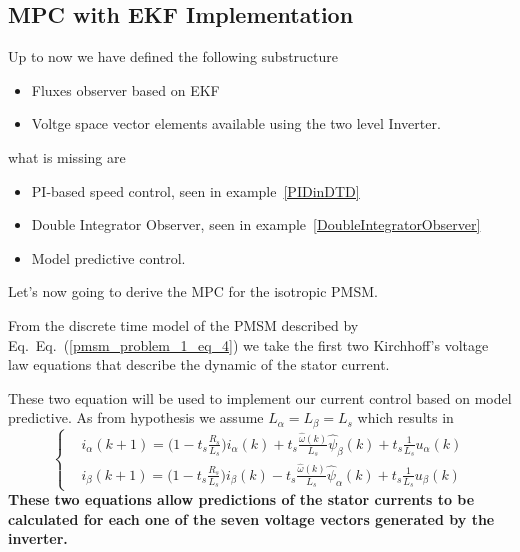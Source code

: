 \documentclass[11pt,a4paper]{scrartcl}
\numberwithin{equation}{section}
\theoremstyle{it}
\theoremstyle{definition}
\renewcommand{\eqref}[1]{Eq.~(\ref{#1})}
\begin{document}
\begin{onehalfspace}
\subsection{MPC with EKF Implementation}
Up to now we have defined the following substructure
\begin{itemize}
	\item[--] Fluxes observer based on EKF 
	\item[--] Voltge space vector elements available using the two level Inverter.
\end{itemize}
what is missing are 
\begin{itemize}
	\item[--] PI-based speed control, seen in example~\ref{PIDinDTD}
	\item[--] Double Integrator Observer, seen in example~\ref{DoubleIntegratorObserver}
	\item[--] Model predictive control.
\end{itemize}
Let's now going to derive the MPC for the isotropic PMSM.

From the discrete time model of the PMSM described by Eq.~\eqref{pmsm_problem_1_eq_4} we take the first two Kirchhoff's voltage law equations that describe the dynamic of the stator current. 

These two equation will be used to implement our current control based on model predictive. As from hypothesis we assume $L_\alpha=L_\beta=L_s$ which results in
\begin{equation}\label{pmsm_problem_1_eq_22}
	\left\lbrace \begin{aligned}
		&i_\alpha(k+1)=\Big(1-t_s\frac{R_s}{L_s}\Big)i_\alpha(k) + 
		t_s\frac{\hat{\omega}(k)}{L_s}\hat{\psi}_\beta(k) + 
		t_s\frac{1}{L_s}u_\alpha(k) \\[6pt] 
		&i_\beta(k+1)=\Big(1-t_s\frac{R_s}{L_s}\Big)i_\beta(k) - 
		t_s\frac{\hat{\omega}(k)}{L_s}\hat{\psi}_\alpha(k) + 
		t_s\frac{1}{L_s}u_\beta(k)
	\end{aligned}\right. 
\end{equation}
\textbf{These two equations allow predictions of the stator currents to be calculated for 
	each one of the seven voltage vectors generated by the inverter.}


\end{onehalfspace}
\end{document}
